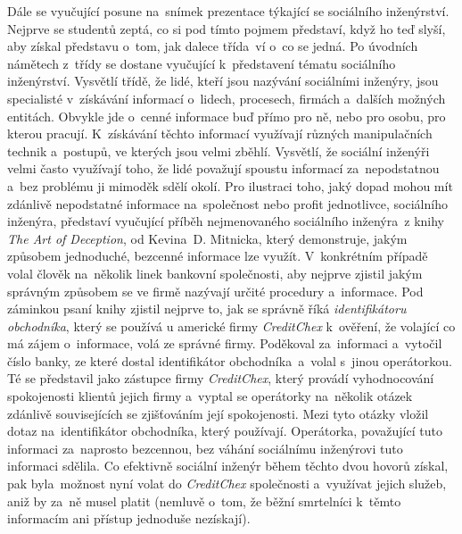 \documentclass[a4paper, 12pt]{article}
\begin{document}
Dále se vyučující posune na~snímek prezentace týkající se sociálního inženýrství. Nejprve se studentů zeptá, co si pod tímto pojmem představí, když ho teď slyší, aby získal představu o~tom, jak dalece třída~ví o~co se jedná. Po úvodních námětech z~třídy se dostane vyučující k~představení tématu sociálního inženýrství. Vysvětlí třídě, že lidé, kteří jsou nazývání sociálními inženýry, jsou specialisté v~získávání informací o~lidech, procesech, firmách a~dalších možných entitách. Obvykle jde o~cenné informace buď přímo pro ně, nebo pro osobu, pro kterou pracují. K~získávání těchto informací využívají různých manipulačních technik a~postupů, ve kterých jsou velmi zběhlí. Vysvětlí, že sociální inženýři velmi často využívají toho, že lidé považují spoustu informací za~nepodstatnou a~bez problému ji mimoděk sdělí okolí. Pro ilustraci toho, jaký dopad mohou mít zdánlivě nepodstatné informace na~společnost nebo profit jednotlivce, sociálního inženýra, představí vyučující příběh nejmenovaného sociálního inženýra~z knihy \textit{The Art of Deception}, od Kevina~D. Mitnicka, který demonstruje, jakým způsobem jednoduché, bezcenné informace lze využít. V~konkrétním případě volal člověk na~několik linek bankovní společnosti, aby nejprve zjistil jakým správným způsobem se ve firmě nazývají určité procedury a~informace. Pod záminkou psaní knihy zjistil nejprve to, jak se správně říká \textit{identifikátoru obchodníka}, který se používá u americké firmy \textit{CreditChex} k~ověření, že volající co má zájem o~informace, volá ze správné firmy. Poděkoval za~informaci a~vytočil číslo banky, ze které dostal identifikátor obchodníka~a~volal s~jinou operátorkou. Té se představil jako zástupce firmy \textit{CreditChex}, který provádí vyhodnocování spokojenosti klientů jejich firmy a~vyptal se operátorky na~několik otázek zdánlivě souvisejících se zjišťováním její spokojenosti. Mezi tyto otázky vložil dotaz na~identifikátor obchodníka, který používají. Operátorka, považující tuto informaci za~naprosto bezcennou, bez váhání sociálnímu inženýrovi tuto informaci sdělila. Co efektivně sociální inženýr během těchto dvou hovorů získal, pak byla~možnost nyní volat do \textit{CreditChex} společnosti a~využívat jejich služeb, aniž by za~ně musel platit (nemluvě o~tom, že běžní smrtelníci k~těmto informacím ani přístup jednoduše nezískají).
\end{document}
